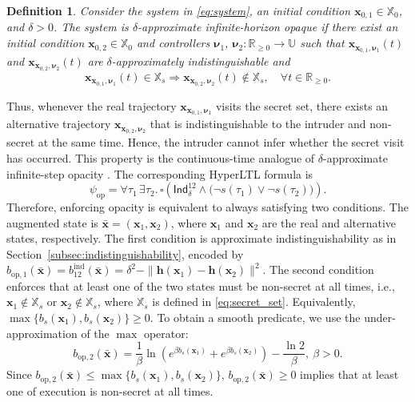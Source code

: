 \documentclass[journal,twoside,web]{ieeecolor}
\newtheorem{definition}[theorem]{Definition}
\begin{document}
\begin{definition} \label{def:opacity}
    Consider the system in \eqref{eq:system}, an initial condition $\mathbf{x}_{0,1} \in \mathbb{X}_0$, and $\delta>0$. The system is \emph{$\delta$-approximate infinite-horizon opaque} if there exist an initial condition $\mathbf{x}_{0,2} \in \mathbb{X}_0$ and controllers $\boldsymbol{\nu}_1$, $\boldsymbol{\nu}_2: \mathbb{R}_{\ge 0} \rightarrow \mathbb{U}$ such that $\mathbf{x}_{\mathbf{x}_{0,1}, \boldsymbol{\nu}_1}(t)$ and $\mathbf{x}_{\mathbf{x}_{0,2}, \boldsymbol{\nu}_2}(t)$ are $\delta$-approximately indistinguishable and
    \begin{equation*}
        \mathbf{x}_{\mathbf{x}_{0,1}, \boldsymbol{\nu}_1}(t) \in \mathbb{X}_s \Rightarrow \mathbf{x}_{\mathbf{x}_{0,2}, \boldsymbol{\nu}_2}(t) \notin \mathbb{X}_s, \quad \forall t \in \mathbb{R}_{\ge 0}.
    \end{equation*}
\end{definition}
Thus, whenever the real trajectory $\mathbf{x}_{\mathbf{x}_{0,1}, \boldsymbol{\nu}_1}$ visits the secret set, there exists an alternative trajectory $\mathbf{x}_{\mathbf{x}_{0,2}, \boldsymbol{\nu}_2}$ that is indistinguishable to the intruder and non-secret at the same time. Hence, the intruder cannot infer whether the secret visit has occurred. This property is the continuous-time analogue of $\delta$-approximate infinite-step opacity \cite{yin2021}. The corresponding HyperLTL formula is
\begin{equation}
\label{eq:hyperltl_opacity}
    \psi_{\mathrm{op}} = \forall \tau_1 \, \exists \tau_2 . \, \square \left( \mathsf{Ind}_{\delta}^{12} \land \big( \neg s(\tau_1)\lor \neg s(\tau_2) \big) \right).
\end{equation}
Therefore, enforcing opacity is equivalent to always satisfying two conditions. The augmented state is $\bar{\mathbf{x}} = (\mathbf{x}_1, \mathbf{x}_2)$, where $\mathbf{x}_1$ and $\mathbf{x}_2$ are the real and alternative states, respectively. The first condition is approximate indistinguishability as in Section~\ref{subsec:indistinguishability}, encoded by $b_{\mathrm{op},1}(\bar{\mathbf{x}}) = b_{12}^{\mathrm{ind}}(\bar{\mathbf{x}}) = \delta^2 - \|\mathbf{h}(\mathbf{x}_1) - \mathbf{h}(\mathbf{x}_2)\|^2$. The second condition enforces that at least one of the two states must be non-secret at all times, i.e., $\mathbf{x}_1 \notin \mathbb{X}_s$ or $\mathbf{x}_2 \notin \mathbb{X}_s$, where $\mathbb{X}_s$ is defined in \eqref{eq:secret_set}. Equivalently, $\max\{b_s(\mathbf{x}_1), b_s(\mathbf{x}_2)\} \ge 0$. To obtain a smooth predicate, we use the under-approximation of the $\max$ operator:
\begin{equation}
\label{eq:opacity_secret_cbf}
    b_{\mathrm{op},2}(\bar{\mathbf{x}}) = \frac{1}{\beta} \ln \left(e^{\beta b_s(\mathbf{x}_1)} + e^{\beta b_s(\mathbf{x}_2)} \right) - \frac{\ln 2}{\beta}, \ \beta > 0.
\end{equation}
Since $b_{\mathrm{op},2}(\bar{\mathbf{x}}) \le \max \{b_s(\mathbf{x}_1),b_s(\mathbf{x}_2)\}$, $b_{\mathrm{op},2}(\bar{\mathbf{x}})\ge 0$ implies that at least one of execution is non-secret at all times.
\end{document}
